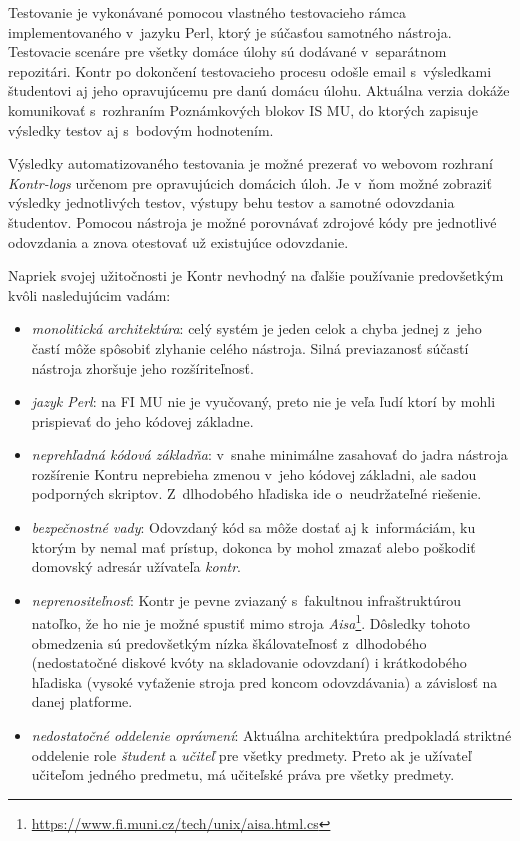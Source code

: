\documentclass[
  digital, %
  oneside, %
  table,   %
  lof,     %
  lot,   %
]{fithesis3}
\begin{document}
Testovanie je vykonávané pomocou vlastného testovacieho rámca implementovaného v~jazyku Perl, ktorý je súčasťou samotného nástroja. Testovacie scenáre pre všetky domáce úlohy sú dodávané v~separátnom repozitári. Kontr po dokončení testovacieho procesu odošle email s~výsledkami študentovi aj jeho opravujúcemu pre danú domácu úlohu. Aktuálna verzia dokáže komunikovať s~rozhraním Poznámkových blokov IS MU, do ktorých zapisuje výsledky testov aj s~bodovým hodnotením.

Výsledky automatizovaného testovania je možné prezerať vo webovom rozhraní \textit{Kontr-logs} určenom pre opravujúcich domácich úloh. Je v~ňom možné zobraziť výsledky jednotlivých testov, výstupy behu testov a samotné odovzdania študentov. Pomocou nástroja je možné porovnávať zdrojové kódy pre jednotlivé odovzdania a znova otestovať už existujúce odovzdanie. 

Napriek svojej užitočnosti je Kontr nevhodný na ďalšie používanie predovšetkým kvôli nasledujúcim vadám:
\begin{itemize}
    \item \emph{monolitická architektúra}: celý systém je jeden celok a chyba jednej z~jeho častí môže spôsobiť zlyhanie celého nástroja. Silná previazanosť súčastí nástroja zhoršuje jeho rozšíriteľnosť.
    \item \emph{jazyk Perl}: na FI MU nie je vyučovaný, preto nie je veľa ľudí ktorí by mohli prispievať do jeho kódovej základne.
    \item \emph{neprehľadná kódová základňa}: v~snahe minimálne zasahovať do jadra nástroja rozšírenie Kontru neprebieha zmenou v~jeho kódovej základni, ale sadou podporných skriptov. Z~dlhodobého hľadiska ide o~neudržateľné riešenie.
    \item\emph{bezpečnostné vady}: Odovzdaný kód sa môže dostať aj k~informáciám, ku ktorým by nemal mať prístup, dokonca by mohol zmazať alebo poškodiť domovský adresár užívateľa \textit{kontr}.
    \item \emph{neprenositeľnosť}: Kontr je pevne zviazaný s~fakultnou infraštruktúrou natoľko, že ho nie je možné spustiť mimo stroja \textit{Aisa}\footnote{\url{https://www.fi.muni.cz/tech/unix/aisa.html.cs}}. Dôsledky tohoto obmedzenia sú predovšetkým nízka škálovateľnosť z~dlhodobého (nedostatočné diskové kvóty na skladovanie odovzdaní) i krátkodobého hľadiska (vysoké vyťaženie stroja pred koncom odovzdávania) a závislosť na danej platforme.
    \item \emph{nedostatočné oddelenie oprávnení}: Aktuálna architektúra predpokladá striktné oddelenie role \emph{študent} a \emph{učiteľ} pre všetky predmety. Preto ak je užívateľ učiteľom jedného predmetu, má učiteľské práva pre všetky predmety.
\end{itemize}
\end{document}
